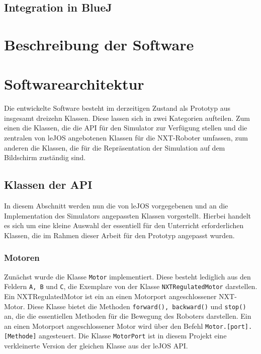 \documentclass[paper=a4, pagesize, DIV=calc, BCOR=12.5mm, twoside=on, onecolumn=on, open = any, titlepage =on, parskip =half-, headsepline = on, footsepline = on, chapterprefix = on, appendixprefix = off, fontsize = 12pt, numbers = noenddot, abstract = on]{scrbook}
\numberwithin{equation}{chapter}
\theoremstyle{definition}
\theoremstyle{plain}
\theoremstyle{plain}
\theoremstyle{remark}
\theoremstyle{plain}
\theoremstyle{plain}
\begin{document}
\par \singlespacing
\subsection{Integration in BlueJ}
\onehalfspacing

\par \singlespacing
\section{Beschreibung der Software}
\onehalfspacing

\par \singlespacing
\section{Softwarearchitektur}
\onehalfspacing 
Die entwickelte Software besteht im derzeitigen Zustand als Prototyp aus insgesamt dreizehn Klassen. Diese lassen sich in zwei Kategorien aufteilen. Zum einen die Klassen, die die API für den Simulator zur Verfügung stellen und die zentralen von leJOS angebotenen Klassen für die NXT-Roboter umfassen, zum anderen die Klassen, die für die Repräsentation der Simulation auf dem Bildschirm zuständig sind.\\

\par \singlespacing
\subsection{Klassen der API}
\label{sec:API}
\onehalfspacing
In diesem Abschnitt werden nun die von leJOS vorgegebenen und an die Implementation des Simulators angepassten Klassen vorgestellt. Hierbei handelt es sich um eine kleine Auswahl der essentiell für den Unterricht erforderlichen Klassen, die im Rahmen dieser Arbeit für den Prototyp angepasst wurden. 
\subsubsection{Motoren}
Zunächst wurde die Klasse \texttt{Motor} implementiert. Diese besteht lediglich aus den Feldern \texttt{A, B} und \texttt{C}, die Exemplare von der Klasse \texttt{NXTRegulatedMotor} darstellen. Ein NXTRegulatedMotor ist ein an einen Motorport angeschlossener NXT-Motor. Diese Klasse bietet die Methoden \texttt{forward(), backward()} und \texttt{stop()} an, die die essentiellen Methoden für die Bewegung des Roboters darstellen. Ein an einen Motorport angeschlossener Motor wird über den Befehl \texttt{Motor.[port].[Methode]} angesteuert. Die Klasse \texttt{MotorPort} ist in diesem Projekt eine verkleinerte Version der gleichen Klasse aus der leJOS API.
\end{document}
